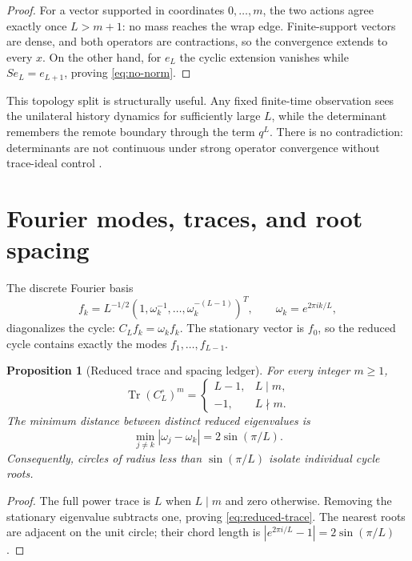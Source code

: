 \documentclass[12pt]{article}
\newtheorem{proposition}[theorem]{Proposition}
\theoremstyle{remark}
\newcommand{\Tr}{\operatorname{Tr}}
\begin{document}
\begin{proof}
For a vector supported in coordinates $0,\ldots,m$, the two actions agree
exactly once $L>m+1$: no mass reaches the wrap edge.  Finite-support vectors
are dense, and both operators are contractions, so the convergence extends
to every $x$.  On the other hand, for $e_L$ the cyclic extension vanishes
while $Se_L=e_{L+1}$, proving \eqref{eq:no-norm}.
\end{proof}

This topology split is structurally useful.  Any fixed finite-time
observation sees the unilateral history dynamics for sufficiently large
$L$, while the determinant remembers the remote boundary through the term
$q^L$.  There is no contradiction: determinants are not continuous under
strong operator convergence without trace-ideal control \citep{Simon2005}.

\section{Fourier modes, traces, and root spacing}

The discrete Fourier basis
\[
 f_k=L^{-1/2}(1,\omega_k^{-1},\ldots,
 \omega_k^{-(L-1)})^T,
 \qquad \omega_k=e^{2\pi ik/L},
\]
diagonalizes the cycle:
$C_Lf_k=\omega_kf_k$.  The stationary vector is $f_0$, so the reduced cycle
contains exactly the modes $f_1,\ldots,f_{L-1}$.

\begin{proposition}[Reduced trace and spacing ledger]\label{prop:ledger}
For every integer $m\ge1$,
\begin{equation}\label{eq:reduced-trace}
 \Tr(C_L^\circ)^m=
 \begin{cases}
 L-1,&L\mid m,\\
 -1,&L\nmid m.
 \end{cases}
\end{equation}
The minimum distance between distinct reduced eigenvalues is
\begin{equation}\label{eq:root-spacing}
 \min_{j\ne k}|\omega_j-\omega_k|=2\sin(\pi/L).
\end{equation}
Consequently, circles of radius less than $\sin(\pi/L)$ isolate individual
cycle roots.
\end{proposition}

\begin{proof}
The full power trace is $L$ when $L\mid m$ and zero otherwise.  Removing the
stationary eigenvalue subtracts one, proving \eqref{eq:reduced-trace}.  The
nearest roots are adjacent on the unit circle; their chord length is
$|e^{2\pi i/L}-1|=2\sin(\pi/L)$.
\end{proof}
\end{document}
